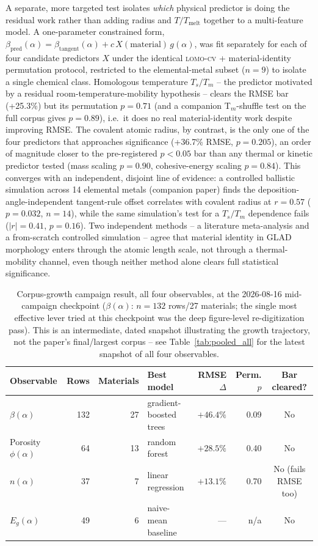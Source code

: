 \documentclass[aip,amsmath,amssymb,reprint]{revtex4-1}
\newcommand{\lomo}{\textsc{lomo-cv}}
\begin{document}
A separate, more targeted test isolates \emph{which} physical predictor is
doing the residual work rather than adding radius and $T/T_{\mathrm{melt}}$
together to a multi-feature model. A one-parameter constrained form,
$\beta_{\mathrm{pred}}(\alpha) = \beta_{\mathrm{tangent}}(\alpha) +
c\,X(\mathrm{material})\,g(\alpha)$, was fit separately for each of four
candidate predictors $X$ under the identical \lomo{} + material-identity
permutation protocol, restricted to the elemental-metal subset
($n=9$) to isolate a single chemical class. Homologous temperature
$T_s/T_m$ -- the predictor motivated by a residual room-temperature-mobility
hypothesis -- clears the RMSE bar (+25.3\%) but its permutation $p=0.71$
(and a companion T$_m$-shuffle test on the full corpus gives $p=0.89$),
i.e.\ it does no real material-identity work despite improving RMSE. The
covalent atomic radius, by contrast, is the only one of the four predictors
that approaches significance (+36.7\% RMSE, $p=0.205$), an order of
magnitude closer to the pre-registered $p<0.05$ bar than any thermal or
kinetic predictor tested (mass scaling $p=0.90$, cohesive-energy scaling
$p=0.84$). This converges with an independent, disjoint line of evidence: a
controlled ballistic simulation across 14 elemental metals (companion
paper) finds the deposition-angle-independent tangent-rule offset
correlates with covalent radius at $r=0.57$ ($p=0.032$, $n=14$), while the
same simulation's test for a $T_s/T_m$ dependence fails
($|r|=0.41$, $p=0.16$). Two independent methods -- a literature
meta-analysis and a from-scratch controlled simulation -- agree that
material identity in GLAD morphology enters through the atomic length
scale, not through a thermal-mobility channel, even though neither method
alone clears full statistical significance.

\begin{table}[htbp]
  \centering
  \caption{Corpus-growth campaign result, all four observables, at the
    2026-08-16 mid-campaign checkpoint ($\beta(\alpha)$: $n=132$
    rows/27 materials; the single most effective lever tried at this
    checkpoint was the deep figure-level re-digitization pass). This is
    an intermediate, dated snapshot illustrating the growth trajectory,
    not the paper's final/largest corpus -- see
    Table~\ref{tab:pooled_all} for the latest snapshot of all four
    observables.}
  \label{tab:corpus_growth}
  \begin{tabular}{lrrlrrc}
    \toprule
    Observable & Rows & Materials & Best model & RMSE $\Delta$ & Perm. $p$ & Bar cleared? \\
    \midrule
    $\beta(\alpha)$          & 132 & 27 & gradient-boosted trees & $+46.4\%$ & 0.09 & No \\
    Porosity $\phi(\alpha)$  & 64  & 13 & random forest          & $+28.5\%$ & 0.40 & No \\
    $n(\alpha)$              & 37  & 7  & linear regression      & $+13.1\%$ & 0.70 & No (fails RMSE too) \\
    $E_g(\alpha)$            & 49  & 6  & naive-mean baseline    & ---       & n/a  & No \\
    \bottomrule
  \end{tabular}
\end{table}
\end{document}
